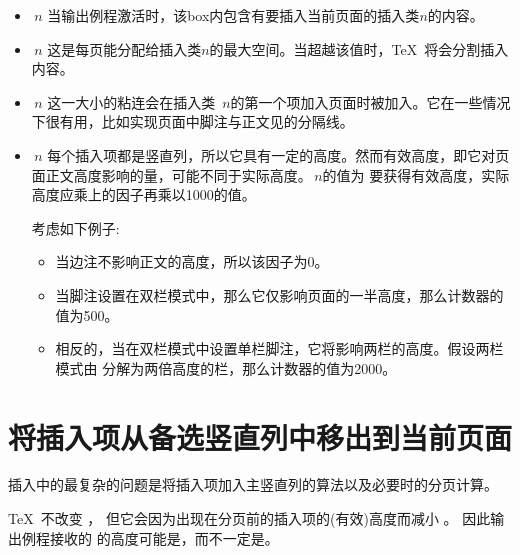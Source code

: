\documentclass{book}
\begin{document}
\begin{itemize}
\item {}$\,n$ 当输出例程激活时，该box内包含有要插入当前页面的插入类$n$的内容。

\item {}$\,n$ 这是每页能分配给插入类$n$的最大空间。当超越该值时，\TeX\ 将会分割插入内容。

\item {}$\,n$ 这一大小的粘连会在插入类~$n$的第一个项加入页面时被加入。它在一些情况下很有用，比如实现页面中脚注与正文见的分隔线。

\item {}$\,n$ 每个插入项都是竖直列，所以它具有一定的高度。然而有效高度，即它对页面正文高度影响的量，可能不同于实际高度。$\,n$的值为
    要获得有效高度，实际高度应乘上的因子再乘以1000的值。

 考虑如下例子:

\begin{itemize}
 \item 当边注不影响正文的高度，所以该因子为0。

 \item 当脚注设置在双栏模式中，那么它仅影响页面的一半高度，那么计数器的值为500。

 \item 相反的，当在双栏模式中设置单栏脚注，它将影响两栏的高度。假设两栏模式由 分解为两倍高度的栏，那么计数器的值为2000。
 \end{itemize}
\end{itemize}

\section{将插入项从备选竖直列中移出到当前页面}

插入中的最复杂的问题是将插入项加入主竖直列的算法以及必要时的分页计算。


\TeX\ 不改变 ，
但它会因为出现在分页前的插入项的(有效)高度而减小 。
因此输出例程接收的  的高度可能是，而不一定是。
\end{document}
